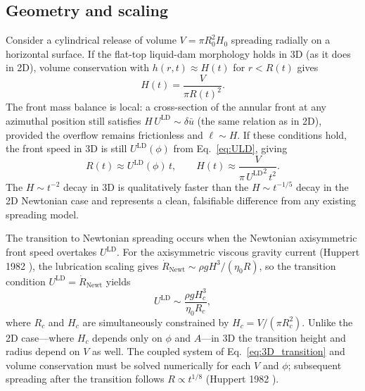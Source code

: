 \documentclass[aps,preprint,superscriptaddress,longbibliography]{revtex4-2}
\newcommand{\ULD}{{U^{\mathrm{LD}}}}
\newcommand{\etaz}{\eta_0}
\begin{document}
\subsection{Geometry and scaling}

Consider a cylindrical release of volume $V = \pi R_0^2 H_0$ spreading
radially on a horizontal surface.  If the flat-top liquid-dam morphology holds
in 3D (as it does in 2D), volume conservation with $h(r,t) \approx H(t)$ for
$r < R(t)$ gives
\begin{equation}
  H(t) = \frac{V}{\pi R(t)^2}.
  \label{eq:3D_conservation}
\end{equation}
The front mass balance is local: a cross-section of the annular front at any
azimuthal position still satisfies $H\,\ULD \sim \delta\bar{u}$ (the same
relation as in 2D), provided the overflow remains frictionless and $\ell \sim H$.
If these conditions hold, the front speed in 3D is still $\ULD(\phi)$ from
Eq.~\eqref{eq:ULD}, giving
\begin{equation}
  R(t) \approx \ULD(\phi)\,t, \qquad
  H(t) \approx \frac{V}{\pi\,\ULD^2\,t^2}.
  \label{eq:3D_kinematics}
\end{equation}
The $H \sim t^{-2}$ decay in 3D is qualitatively faster than the $H \sim
t^{-1/5}$ decay in the 2D Newtonian case and represents a clean, falsifiable
difference from any existing spreading model.

The transition to Newtonian spreading occurs when the Newtonian axisymmetric
front speed overtakes $\ULD$.  For the axisymmetric viscous gravity current
(Huppert 1982 \cite{Huppert1982}), the lubrication scaling gives
$\dot{R}_\text{Newt} \sim \rho g H^3/(\eta_0 R)$, so the transition condition
$\ULD = \dot{R}_\text{Newt}$ yields
\begin{equation}
  \ULD \sim \frac{\rho g H_c^3}{\etaz R_c},
  \label{eq:3D_transition}
\end{equation}
where $R_c$ and $H_c$ are simultaneously constrained by
$H_c = V/(\pi R_c^2)$.  Unlike the 2D case---where $H_c$ depends only on
$\phi$ and $A$---in 3D the transition height and radius depend on $V$ as well.
The coupled system of Eq.~\eqref{eq:3D_transition} and volume conservation
must be solved numerically for each $V$ and $\phi$; subsequent spreading after
the transition follows $R \propto t^{1/8}$ (Huppert 1982 \cite{Huppert1982}).
\end{document}
